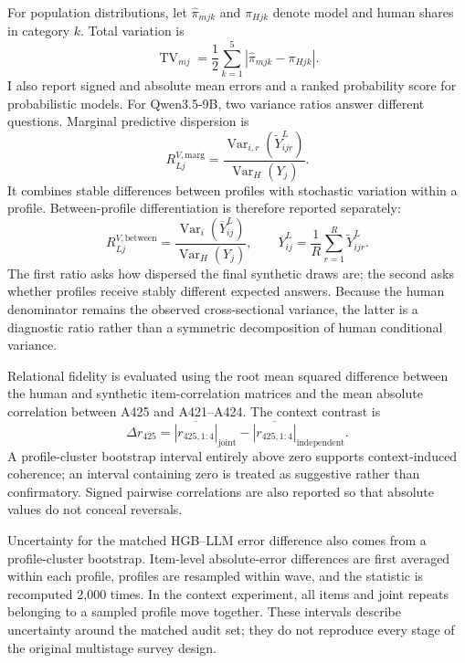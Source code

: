 \documentclass[11pt]{article}
\newcommand{\Var}{\operatorname{Var}}
\newcommand{\TV}{\operatorname{TV}}
\begin{document}
For population distributions, let $\widehat{\pi}_{mjk}$ and $\pi_{Hjk}$ denote model and human shares in category $k$. Total variation is
\begin{equation}
    \TV_{mj}
    =
    \frac{1}{2}
    \sum_{k=1}^{5}
    \left|
    \widehat{\pi}_{mjk}-\pi_{Hjk}
    \right|.
    \label{eq:tv}
\end{equation}
I also report signed and absolute mean errors and a ranked probability score for probabilistic models. For Qwen3.5-9B, two variance ratios answer different questions. Marginal predictive dispersion is
\begin{equation}
    R^{V,\mathrm{marg}}_{Lj}
    =
    \frac{\Var_{i,r}(\widetilde{Y}^{L}_{ijr})}{\Var_H(Y_j)}.
    \label{eq:variance-ratio}
\end{equation}
It combines stable differences between profiles with stochastic variation within a profile. Between-profile differentiation is therefore reported separately:
\begin{equation}
    R^{V,\mathrm{between}}_{Lj}
    =
    \frac{\Var_i(\overline{Y}^{L}_{ij})}{\Var_H(Y_j)},
    \qquad
    \overline{Y}^{L}_{ij}=\frac{1}{R}\sum_{r=1}^{R}\widetilde{Y}^{L}_{ijr}.
    \label{eq:between-variance-ratio}
\end{equation}
The first ratio asks how dispersed the final synthetic draws are; the second asks whether profiles receive stably different expected answers. Because the human denominator remains the observed cross-sectional variance, the latter is a diagnostic ratio rather than a symmetric decomposition of human conditional variance.

Relational fidelity is evaluated using the root mean squared difference between the human and synthetic item-correlation matrices and the mean absolute correlation between A425 and A421--A424. The context contrast is
\begin{equation}
    \Delta r_{425}
    =\overline{|r_{425,1:4}|}_{\mathrm{joint}}
    -\overline{|r_{425,1:4}|}_{\mathrm{independent}}.
    \label{eq:context-contrast}
\end{equation}
A profile-cluster bootstrap interval entirely above zero supports context-induced coherence; an interval containing zero is treated as suggestive rather than confirmatory. Signed pairwise correlations are also reported so that absolute values do not conceal reversals.

Uncertainty for the matched HGB--LLM error difference also comes from a profile-cluster bootstrap. Item-level absolute-error differences are first averaged within each profile, profiles are resampled within wave, and the statistic is recomputed 2,000 times. In the context experiment, all items and joint repeats belonging to a sampled profile move together. These intervals describe uncertainty around the matched audit set; they do not reproduce every stage of the original multistage survey design.
\end{document}
